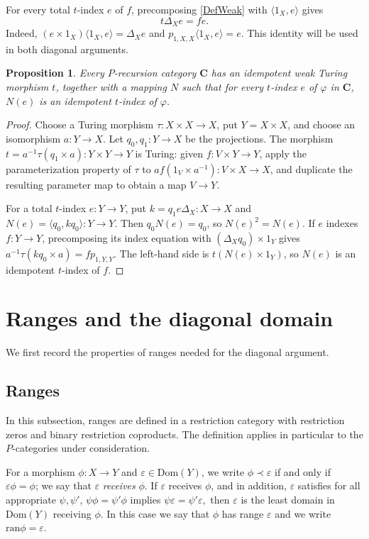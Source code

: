 \documentclass[letterpaper,10pt]{amsart}
\theoremstyle{plain}
\newtheorem{prop}{Proposition}[thm]
\theoremstyle{definition}
\begin{document}
For every total $t$-index $e$ of $f$, precomposing
\eqref{DefWeak} with $\langle1_X,e\rangle$ gives
\begin{equation}\label{EqDiagonalIndex}
t\Delta_Xe=fe.
\end{equation}
Indeed, $(e\times1_X)\langle1_X,e\rangle=\Delta_Xe$ and
$p_{1,X,X}\langle1_X,e\rangle=e$. This identity will be used in
both diagonal arguments.

\begin{prop}\label{IdempotentTheorem}
Every $P$-recursion category $\mathbf{C}$ has an idempotent weak
Turing morphism $t$, together with a mapping $N$ such that for
every $t$-index $e$ of $\varphi$ in $\mathbf{C}$, $N(e)$ is an
idempotent $t$-index of $\varphi$.
\end{prop}
\begin{proof}
Choose a Turing morphism $\tau:X\times X\to X$, put $Y=X\times X$,
and choose an isomorphism $a:Y\to X$. Let $q_0,q_1:Y\to X$ be
the projections. The morphism
$t=a^{-1}\tau(q_1\times a):Y\times Y\to Y$ is Turing: given
$f:V\times Y\to Y$, apply the
parameterization property of $\tau$ to
$af(1_V\times a^{-1}):V\times X\to X$, and duplicate the resulting
parameter map to obtain a map $V\to Y$.

For a total $t$-index $e:Y\to Y$, put
$k=q_1e\Delta_X:X\to X$ and $N(e)=\langle q_0,kq_0\rangle:Y\to Y$.
Then $q_0N(e)=q_0$, so $N(e)^2=N(e)$. If $e$ indexes
$f:Y\to Y$, precomposing its index equation with
$(\Delta_Xq_0)\times1_Y$ gives
$a^{-1}\tau(kq_0\times a)=fp_{1,Y,Y}$.
The left-hand side is $t(N(e)\times1_Y)$, so $N(e)$ is an
idempotent $t$-index of $f$.
\end{proof}

\section{Ranges and the diagonal domain}\label{sec:diagonal}

We first record the properties of ranges needed for the diagonal argument.

\subsection{Ranges}\label{sec:ranges}
In this subsection, ranges are defined in a restriction category with
restriction zeros and binary restriction coproducts. The definition
applies in particular to the $P$-categories under consideration.

For a morphism $\phi:X\to Y$ and $\varepsilon\in\mathrm{Dom}(Y)$, we write
$\phi\prec\varepsilon$ if and only if $\varepsilon\phi=\phi$; we
say that $\varepsilon$ {\it receives} $\phi$. If $\varepsilon$
receives $\phi$, and in addition, $\varepsilon$ satisfies for all
appropriate $\psi,\psi'$, $\psi\phi=\psi'\phi$ implies
$\psi\varepsilon=\psi'\varepsilon,$ then $\varepsilon$ is the
least domain in $\mathrm{Dom}(Y)$ receiving $\phi$. In this case
we say that $\phi$ has range $\varepsilon$ and we write
$\mathrm{ran}\phi=\varepsilon$.
\end{document}
